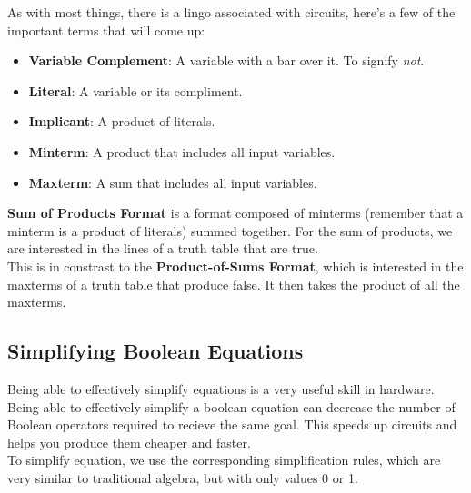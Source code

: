 \documentclass[12pt, twoside, exarticle]{article}
\begin{document}
As with most things, there is a lingo associated with circuits, here's a few of the important terms that will come up:
\begin{itemize}
\item \textbf{Variable Complement}: A variable with a bar over it.  To signify \emph{not}.
\item \textbf{Literal}: A variable or its compliment.
\item \textbf{Implicant}: A product of literals.
\item \textbf{Minterm}: A product that includes all input variables.
\item \textbf{Maxterm}: A sum that includes all input variables.
\end{itemize}

\textbf{Sum of Products Format} is a format composed of minterms (remember that a minterm is a product of literals) summed together.  For the sum of products, we are interested in the lines of a truth table that are true. \\

This is in constrast to the \textbf{Product-of-Sums Format}, which is interested in the maxterms of a truth table that produce false.  It then takes the product of all the maxterms. \\

\subsection{Simplifying Boolean Equations}
Being able to effectively simplify equations is a very useful skill in hardware.  Being able to effectively simplify a boolean equation can decrease the number of Boolean operators required to recieve the same goal.  This speeds up circuits and helps you produce them cheaper and faster. \\

To simplify equation, we use the corresponding simplification rules, which are very similar to traditional algebra, but with only values 0 or 1. \\
\end{document}
